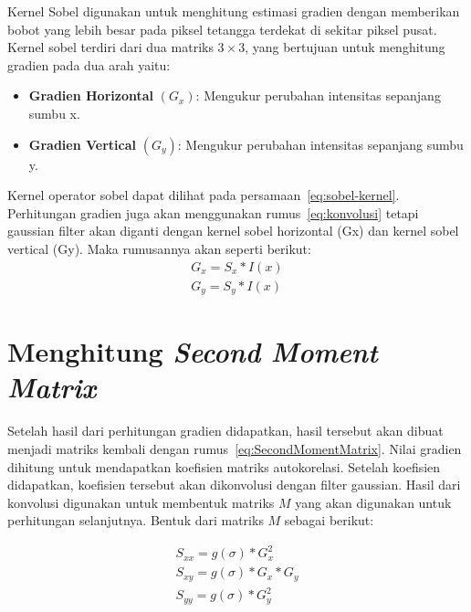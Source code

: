     Kernel Sobel digunakan untuk menghitung estimasi gradien dengan memberikan bobot yang lebih besar pada piksel tetangga terdekat di sekitar piksel pusat.
Kernel sobel terdiri dari dua matriks \(3 \times 3\), yang bertujuan untuk menghitung gradien pada dua arah yaitu:
 \begin{itemize}
    \item \textbf{Gradien Horizontal} \((G_{x})\): Mengukur perubahan intensitas sepanjang sumbu x.
    \item \textbf{Gradien Vertical} \((G_{y})\): Mengukur perubahan intensitas sepanjang sumbu y.
\end{itemize}Kernel operator sobel dapat dilihat pada persamaan~\eqref{eq:sobel-kernel}. 
Perhitungan gradien juga akan menggunakan rumus~\eqref{eq:konvolusi} tetapi gaussian filter akan diganti dengan kernel sobel horizontal (Gx) dan kernel sobel vertical (Gy).
Maka rumusannya akan seperti berikut:
\begin{equation}
    \begin{aligned}
        G_{x} = S_{x} * I(x)\\ G_{y} = S_{y} * I(x)
    \end{aligned}
\end{equation}


\section{Menghitung \emph{Second Moment Matrix}}
    Setelah hasil dari perhitungan gradien didapatkan, hasil tersebut akan dibuat menjadi matriks kembali dengan rumus~\eqref{eq:SecondMomentMatrix}. Nilai gradien dihitung untuk mendapatkan koefisien matriks autokorelasi. Setelah koefisien didapatkan, koefisien tersebut akan dikonvolusi dengan filter gaussian.
Hasil dari konvolusi digunakan untuk membentuk matriks \(M\) yang akan digunakan untuk perhitungan selanjutnya. Bentuk dari matriks \(M\) sebagai berikut:

\begin{equation}
    \begin{aligned}
        S_{xx} = g(\sigma) * G_{x}^2 \\
        S_{xy} = g(\sigma) * G_{x} * G_{y} \\
        S_{yy} = g(\sigma) * G_{y}^2
    \end{aligned}
\end{equation}

